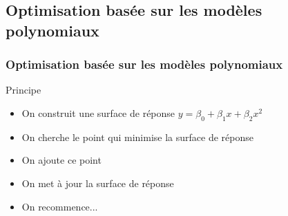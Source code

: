 \documentclass{beamer}
\begin{document}
\subsection{Optimisation basée sur les modèles polynomiaux}
\begin{frame}
\frametitle{Optimisation basée sur les modèles polynomiaux}
\begin{block}{Principe}
 \begin{itemize}
  \item On construit une surface de réponse $y = \beta_0 + \beta_1 x + \beta_2 x^2$
  \item On cherche le point qui minimise la surface de réponse
  \item On ajoute ce point
  \item On met à jour la surface de réponse
  \item On recommence...
 \end{itemize}
\end{block}


\end{frame}
\end{document}
